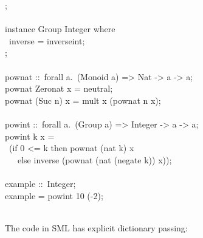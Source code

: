 \begin{isabellebody}
\begin{isamarkuptext}
\hspace*{0pt}{\char125};\\
\hspace*{0pt}\\
\hspace*{0pt}instance Group Integer where {}\\
\hspace*{0pt} ~inverse = inverse{}int;\\
\hspace*{0pt}{\char125};\\
\hspace*{0pt}\\
\hspace*{0pt}pow{}nat ::~forall a.~(Monoid a) => Nat -> a -> a;\\
\hspace*{0pt}pow{}nat Zero{}nat x = neutral;\\
\hspace*{0pt}pow{}nat (Suc n) x = mult x (pow{}nat n x);\\
\hspace*{0pt}\\
\hspace*{0pt}pow{}int ::~forall a.~(Group a) => Integer -> a -> a;\\
\hspace*{0pt}pow{}int k x =\\
\hspace*{0pt} ~(if 0 <= k then pow{}nat (nat k) x\\
\hspace*{0pt} ~~~else inverse (pow{}nat (nat (negate k)) x));\\
\hspace*{0pt}\\
\hspace*{0pt}example ::~Integer;\\
\hspace*{0pt}example = pow{}int 10 (-2);\\
\hspace*{0pt}\\
\hspace*{0pt}{\char125}%
\end{isamarkuptext}%
\isamarkuptrue%
%
\endisatagquote
{\isafoldquote}%
%
\isadelimquote
%
\endisadelimquote
%
\begin{isamarkuptext}%
\noindent The code in SML has explicit dictionary passing:%
\end{isamarkuptext}%

\end{isabellebody}
